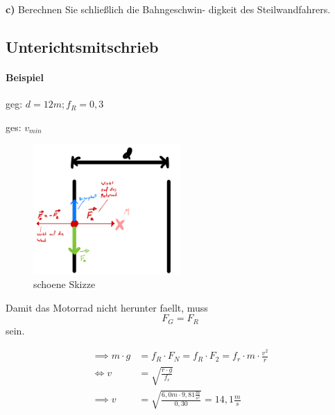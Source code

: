 \documentclass{report}
\begin{document}
\textbf{c)} Berechnen Sie schließlich die Bahngeschwin-
digkeit des Steilwandfahrers.

\clearpage
\subsection{Unterichtsmitschrieb}
\paragraph{Beispiel}

geg: $d=12m; f_R = 0,3$

ges: $v_{min}$

\begin{figure}[htpb]
  \begin{center}
    \includegraphics[width=0.5\textwidth]{./physic-figures/motorrad-kraft.jpg}
  \end{center}
  \caption{schoene Skizze}
\end{figure}

Damit das Motorrad nicht herunter faellt, muss \[F_G = F_R\] sein.

\begin{align*}
  \implies m\cdot g&=f_R \cdot F_N = f_R\cdot F_2 = f_r\cdot m \cdot \frac{v^2}{r}\\
  \Leftrightarrow v &= \sqrt{\frac{r\cdot g}{f_r}}\\
  \implies v &=\sqrt{\frac{6,0m\cdot 9,81 \frac{m}{s^2}}{0,30}} = 14,1 \frac{m}{s}\\
\end{align*}
\end{document}
